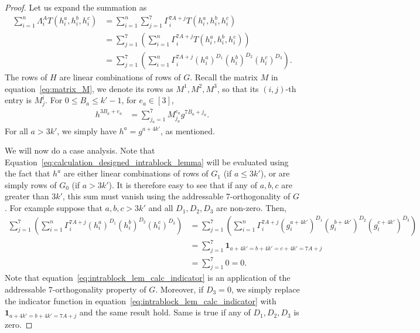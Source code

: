 \documentclass[10pt,a4paper]{amsart}
\renewcommand{\le}{\leqslant}
\renewcommand{\leq}{\leqslant}
\newcommand{\one}{\boldsymbol{1}}
\begin{document}
\begin{proof}
    Let us expand the summation as 
    \begin{align}
        \sum_{i=1}^n \Lambda^A_iT(h^{a}_i, h^b_i,h^c_i)
        &= 
        \sum_{i=1}^n \sum_{j=1}^7 \Gamma^{7A+j}_i T(h^{a}_i, h^b_i,h^c_i) \\
        &= 
        \sum_{j=1}^7 \left(\sum_{i=1}^n \Gamma^{7A+j}_i T(h^{a}_i, h^b_i,h^c_i)\right) \\
        &=\sum_{j=1}^7 \left(\sum_{i=1}^n \Gamma^{7A+j}_i (h^{a}_i)^{D_1} (h^b_i)^{D_2}(h^c_i)^{D_3}\right).\label{eq:calculation_designed_intrablock_lemma}
    \end{align}
    The rows of $H$ are linear combinations of rows of $G$. 
    Recall the matrix $M$ in equation~\eqref{eq:matrix_M},
    we denote its rows as $M^1, M^2, M^3$, so that its $(i,j)$-th entry is $M^i_j$. 
    For $0\le B_a\le k'-1$, for $e_a\in [3]$,
    \begin{align}
        h^{3B_a+e_a} &= \sum_{j_a=1}^7 M^{e_a}_{j_a} g^{7B_a+j_a}.
    \end{align}
    For all $a > 3k'$, we simply have $h^a = g^{a + 4k'}$, as mentioned.
    
    We will now do a case analysis. Note that Equation~\eqref{eq:calculation_designed_intrablock_lemma} will be evaluated using the fact that $h^a$ are either linear combinations of rows of $G_1$ (if $a \leq 3k'$), or are simply rows of $G_0$ (if $a > 3k'$). It is therefore easy to see that if any of $a,b,c$ are greater than $3k'$, this sum must vanish using the addressable 7-orthogonality of $G$. For example suppose that $a, b, c > 3k'$ and all $D_1, D_2, D_3$ are non-zero. Then,
    \begin{align}
        \sum_{j=1}^7 \left(\sum_{i=1}^n \Gamma^{7A+j}_i (h^{a}_i)^{D_1} (h^b_i)^{D_2}(h^c_i)^{D_3}\right)
        &= \sum_{j=1}^7 \left(\sum_{i=1}^n \Gamma^{7A+j}_i 
        \left(g^{a+4k'}_i \right)^{D_1} 
        \left(g^{b+4k'}_i \right)^{D_2}
        \left(g^{c+4k'}_i \right)^{D_3}
        \right) \\
        &= \sum_{j=1}^7 \one_{a+4k'=b+4k'=c+4k'=7A+j} \label{eq:intrablock_lem_calc_indicator} \\
        &= \sum_{j=1}^7 0 = 0.
    \end{align}
    Note that equation~\eqref{eq:intrablock_lem_calc_indicator} is an application of the addressable $7$-orthogonality property of $G$.
    Moreover, if $D_3 = 0$, we simply replace the indicator function in equation~\eqref{eq:intrablock_lem_calc_indicator} with $\one_{a+4k'=b+4k'=7A+j}$ and the same result hold. Same is true if any of $D_1,D_2,D_3$ is zero. 
     

\end{proof}
\end{document}

